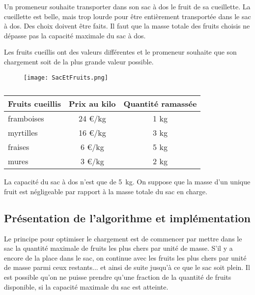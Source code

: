 
Un promeneur souhaite transporter dans son sac à dos le fruit de sa cueillette. La cueillette est belle, mais trop lourde pour être entièrement transportée dans le sac à dos. Des choix doivent être faits. Il faut que la masse totale des fruits choisis ne dépasse pas la capacité maximale du sac à dos.

Les fruits cueillis ont des valeurs différentes et le promeneur souhaite que son chargement soit de la plus grande valeur possible.

\begin{figure}[h]
\centering
\texttt{[image: SacEtFruits.png]}
\label{fig:SacEtFruits}
\end{figure}



\begin{table}[h]
\centering
\begin{tabular}{|l|c|c|}
\hline
Fruits cueillis	& Prix au kilo & Quantité ramassée\\
\hline
framboises& 24 €/kg  & 1 kg \\
myrtilles & 16 €/kg & 3 kg  \\
fraises & 6 €/kg & 5 kg \\
mures & 3 €/kg & 2 kg \\
\hline
\end{tabular}
\caption{}
\label{tab_fruit}
\end{table}

La capacité du sac à dos n’est que de \SI{5}{kg}.
On suppose que la masse d’un unique fruit est négligeable par rapport à la masse totale du sac en charge.

\subsection*{Présentation de l’algorithme et implémentation}
\label{sec:PrésentationDeLAlgorithmeEtImplémentation}

Le principe pour optimiser le chargement est de commencer par mettre dans le sac la quantité maximale de fruits les plus chers par unité de masse. S’il y a encore de la place dans le sac, on continue avec les fruits les plus chers par unité de masse parmi ceux restants... et ainsi de suite jusqu’à ce que le sac soit plein. Il est possible qu’on ne puisse prendre qu’une fraction de la quantité de fruits disponible, si la capacité maximale du sac est atteinte. %

